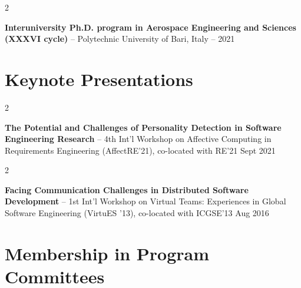 \documentclass[10pt, a4paper]{article}
\newenvironment{twocolentry}[2][]{
    \onecolentry
    \def\secondColumn{#2}
    \setcolumnwidth{\fill, 4.5 cm}
    \begin{paracol}{2}
}{
    \switchcolumn \raggedleft \secondColumn
    \end{paracol}
    \endonecolentry
} %
\begin{document}
        \vspace{0.2 cm}

        \begin{twocolentry}{
            2020 – 2021
        }
            \textbf{Interuniversity Ph.D. program in Aerospace Engineering and Sciences (XXXVI cycle)} -- Polytechnic University of Bari, Italy\end{twocolentry}




    
    \section{Keynote Presentations}



        
        \begin{twocolentry}{
            Sept 2021
        }
            \textbf{The Potential and Challenges of Personality Detection in Software Engineering Research} -- 4th Int'l Workshop on Affective Computing in Requirements Engineering (AffectRE’21), co-located with RE’21\end{twocolentry}



        \vspace{0.2 cm}

        \begin{twocolentry}{
            Aug 2016
        }
            \textbf{Facing Communication Challenges in Distributed Software Development} -- 1st Int’l Workshop on Virtual Teams: Experiences in Global Software Engineering (VirtuES ’13), co-located with ICGSE’13\end{twocolentry}




    
    \section{Membership in Program Committees}
\end{document}
